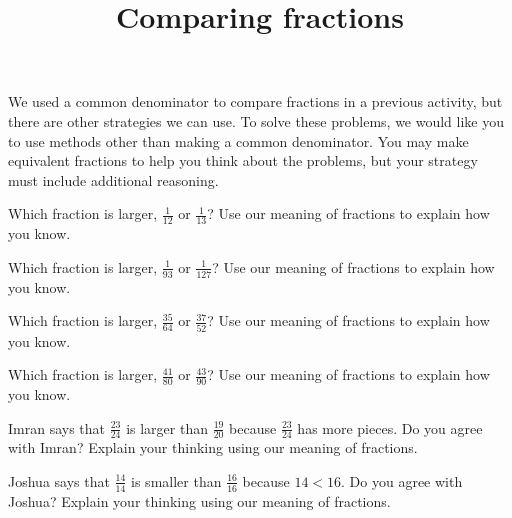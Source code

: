 \documentclass[nooutcomes,noauthor]{ximera}
\title{Comparing fractions}
\begin{document}
\begin{abstract}

\end{abstract}

\maketitle


We used a common denominator to compare fractions in a previous activity, but there are other strategies we can use. To solve these problems, we would like you to use methods other than making a common denominator. You may make equivalent fractions to help you think about the problems, but your strategy must include additional reasoning.

\begin{problem}
Which fraction is larger, $\frac{1}{12}$ or $\frac{1}{13}$? Use our meaning of fractions to explain how you know.
\end{problem}


\begin{problem}
Which fraction is larger, $\frac{1}{93}$ or $\frac{1}{127}$? Use our meaning of fractions to explain how you know.
\end{problem}


\begin{problem}
Which fraction is larger, $\frac{35}{64}$ or $\frac{37}{52}$? Use our meaning of fractions to explain how you know.
\end{problem}



\begin{problem}
Which fraction is larger, $\frac{41}{80}$ or $\frac{43}{90}$? Use our meaning of fractions to explain how you know.
\end{problem}



\begin{problem}

Imran says that $\frac{23}{24}$ is larger than $\frac{19}{20}$ because $\frac{23}{24}$ has more pieces. Do you agree with Imran? Explain your thinking using our meaning of fractions.

\end{problem}


\begin{problem}
Joshua says that $\frac{14}{14}$ is smaller than $\frac{16}{16}$ because $14 < 16$. Do you agree with Joshua? Explain your thinking using our meaning of fractions.
\end{problem}
\end{document}
